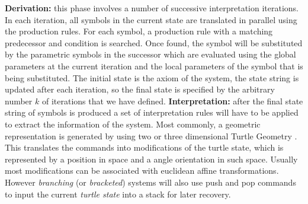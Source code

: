 \documentclass[letterpaper,twoside,11pt]{article}
\begin{document}
\begin{multicols}{2}
\textbf{Derivation:} this phase involves a number of successive interpretation iterations. In each iteration, all symbols in the current state are translated in parallel using the production rules. For each symbol, a production rule with a matching predecessor and condition is searched. Once found, the symbol will be substituted by the parametric symbols in the successor which are evaluated using the global parameters at the current iteration and the local parameters of the symbol that is being substituted. The initial state is the axiom of the system, the state string is updated after each iteration, so the final state is specified by the arbitrary number $k$ of iterations that we have defined.
\vfill
\columnbreak
\textbf{Interpretation:} after the final state string of symbols is produced a set of interpretation rules will have to be applied to extract the information of the system. Most commonly, a geometric representation is generated by using two or three dimensional Turtle Geometry \cite{abelson1986turtle}. This translates the commands into modifications of the turtle state, which is represented by a position in space and a angle orientation in such space. Usually most modifications can be associated with euclidean affine transformations. However \emph{branching} (or \emph{bracketed}) systems will also use push and pop commands to input the current \emph{turtle state} into a stack for later recovery.


\end{multicols}
\end{document}
